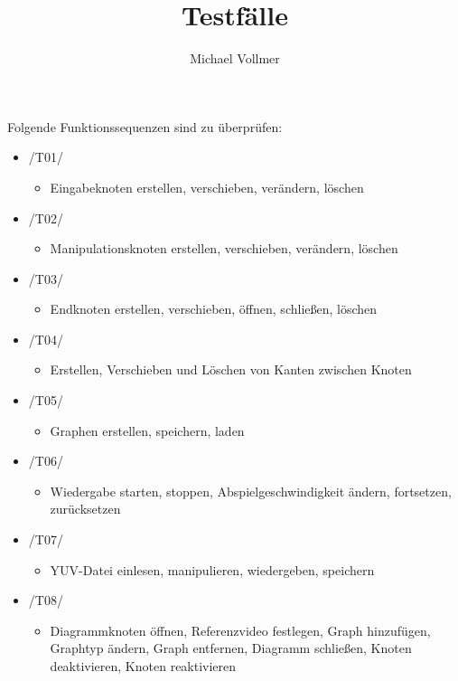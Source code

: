 \documentclass{article}
\begin{document}
\title{Testfälle}
\author{Michael Vollmer}
\maketitle

Folgende Funktionssequenzen sind zu überprüfen:
\begin{itemize}
	\item /T01/
		\begin{itemize}
			\item Eingabeknoten erstellen, verschieben, verändern, löschen
		\end{itemize}
	\item /T02/
		\begin{itemize}
			\item Manipulationsknoten erstellen, verschieben, verändern, löschen
		\end{itemize}
	\item /T03/
		\begin{itemize}
			\item Endknoten erstellen, verschieben, öffnen, schließen, löschen
		\end{itemize}
	\item /T04/
		\begin{itemize}
			\item Erstellen, Verschieben und Löschen von Kanten zwischen Knoten
		\end{itemize}
	\item /T05/
		\begin{itemize}
			\item Graphen erstellen, speichern, laden
		\end{itemize}
	\item /T06/
		\begin{itemize}
			\item Wiedergabe starten, stoppen, Abspielgeschwindigkeit ändern, fortsetzen, zurücksetzen
		\end{itemize}
	\item /T07/
		\begin{itemize}
			\item YUV-Datei einlesen, manipulieren, wiedergeben, speichern
		\end{itemize}
	\item /T08/
		\begin{itemize}
			\item Diagrammknoten öffnen, Referenzvideo festlegen, Graph hinzufügen, Graphtyp ändern, Graph entfernen, Diagramm schließen, Knoten deaktivieren, Knoten 
			reaktivieren
		\end{itemize}
\end{itemize}
\end{document}
